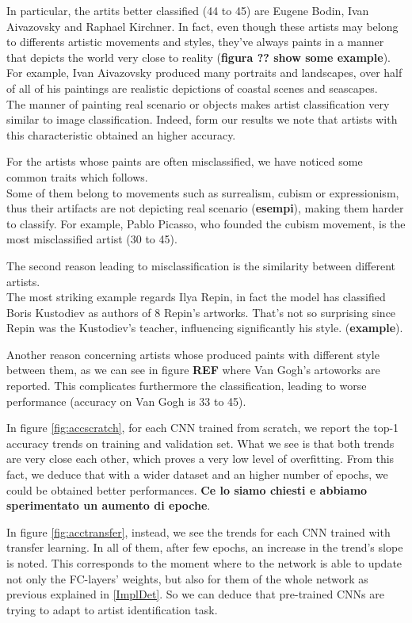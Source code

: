 \documentclass{article}
\begin{document}
In particular, the artits better classified (44 to 45) are Eugene Bodin, Ivan Aivazovsky and Raphael Kirchner. In fact, even though these artists may belong to differents artistic movements and styles, they've always paints in a manner that depicts the world very close to reality (\textbf{figura ?? show some example}).\\
For example, Ivan Aivazovsky produced many portraits and landscapes, over half of all of his paintings are realistic depictions of coastal scenes and seascapes. \\
The manner of painting real scenario or objects makes artist classification very similar to image classification. Indeed, form our results we note that artists with this characteristic obtained an higher accuracy.

For the artists whose paints are often misclassified, we have noticed some common traits which follows.\\
Some of them belong to movements such as surrealism, cubism or expressionism, thus their artifacts are not depicting real scenario (\textbf{esempi}), making them harder to classify.
For example, Pablo Picasso, who founded the cubism movement, is the most misclassified artist (30 to 45).
  
The second reason leading to misclassification is the similarity  between different artists.\\
The most striking example regards Ilya Repin, in fact the model has classified Boris Kustodiev as authors of 8 Repin's artworks. That's not so surprising since Repin was the Kustodiev's teacher, influencing significantly his style. (\textbf{example}).

Another reason concerning artists whose produced paints with different style between them, as we can see in figure \textbf{REF} where Van Gogh's artoworks are reported. This complicates furthermore the classification, leading to worse performance (accuracy on Van Gogh is 33 to 45).

In figure \ref{fig:accscratch}, for each CNN trained from scratch,  we report the top-1 accuracy trends on training and validation set. What we see is that both trends are very close each other, which proves a very low level of overfitting.
From this fact, we deduce that with a wider dataset and an higher number of epochs, we could be obtained better performances. \textbf{Ce lo siamo chiesti e abbiamo sperimentato un aumento di epoche}.



In figure \ref{fig:acctransfer}, instead, we see the trends for each CNN trained with transfer learning. In all of them, after few epochs, an increase in the trend's slope is noted. This corresponds to the moment where to the network is able to update not only the FC-layers' weights, but also for them of the whole network as previous explained in \ref{ImplDet}. So we can deduce that pre-trained CNNs are trying to adapt to artist identification task.
\end{document}
